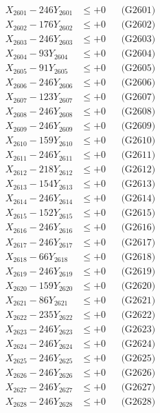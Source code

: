 \documentclass[a4paper,10pt]{article}
\begin{document}
{\begin{align}
\allowbreak
X_{2601} - 246Y_{2601} &\leq +0 && \text{(G2601)} \\
X_{2602} - 176Y_{2602} &\leq +0 && \text{(G2602)} \\
X_{2603} - 246Y_{2603} &\leq +0 && \text{(G2603)} \\
X_{2604} - 93Y_{2604} &\leq +0 && \text{(G2604)} \\
X_{2605} - 91Y_{2605} &\leq +0 && \text{(G2605)} \\
X_{2606} - 246Y_{2606} &\leq +0 && \text{(G2606)} \\
X_{2607} - 123Y_{2607} &\leq +0 && \text{(G2607)} \\
X_{2608} - 246Y_{2608} &\leq +0 && \text{(G2608)} \\
X_{2609} - 246Y_{2609} &\leq +0 && \text{(G2609)} \\
X_{2610} - 159Y_{2610} &\leq +0 && \text{(G2610)} \\
\allowbreak
X_{2611} - 246Y_{2611} &\leq +0 && \text{(G2611)} \\
X_{2612} - 218Y_{2612} &\leq +0 && \text{(G2612)} \\
X_{2613} - 154Y_{2613} &\leq +0 && \text{(G2613)} \\
X_{2614} - 246Y_{2614} &\leq +0 && \text{(G2614)} \\
X_{2615} - 152Y_{2615} &\leq +0 && \text{(G2615)} \\
X_{2616} - 246Y_{2616} &\leq +0 && \text{(G2616)} \\
X_{2617} - 246Y_{2617} &\leq +0 && \text{(G2617)} \\
X_{2618} - 66Y_{2618} &\leq +0 && \text{(G2618)} \\
X_{2619} - 246Y_{2619} &\leq +0 && \text{(G2619)} \\
X_{2620} - 159Y_{2620} &\leq +0 && \text{(G2620)} \\
\allowbreak
X_{2621} - 86Y_{2621} &\leq +0 && \text{(G2621)} \\
X_{2622} - 235Y_{2622} &\leq +0 && \text{(G2622)} \\
X_{2623} - 246Y_{2623} &\leq +0 && \text{(G2623)} \\
X_{2624} - 246Y_{2624} &\leq +0 && \text{(G2624)} \\
X_{2625} - 246Y_{2625} &\leq +0 && \text{(G2625)} \\
X_{2626} - 246Y_{2626} &\leq +0 && \text{(G2626)} \\
X_{2627} - 246Y_{2627} &\leq +0 && \text{(G2627)} \\
X_{2628} - 246Y_{2628} &\leq +0 && \text{(G2628)} \\

\end{align}}
\end{document}
